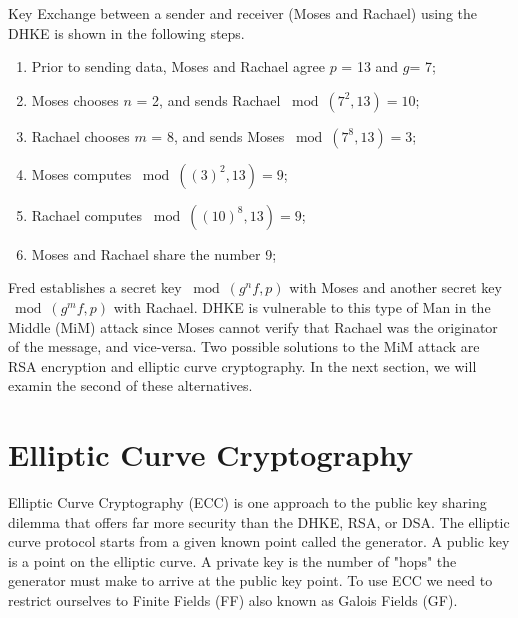  \begin{eg} Key Exchange between a sender and receiver (Moses and Rachael) using the DHKE is shown in the following steps.
\begin{enumerate}[Step 1.]
\item Prior to sending data, Moses and Rachael agree $p$ = 13 and $g$= 7; 
\item Moses chooses $n$ = 2, and sends Rachael $\bmod (7^2 , 13) = 10$;
\item Rachael chooses $m$ = 8, and sends Moses $\bmod (7^8  , 13) = 3 $;
\item Moses computes $\bmod ((3)^2 , 13 ) = 9$;
\item Rachael computes $\bmod ((10)^8 , 13 ) = 9$;
\item Moses and Rachael share the number 9;
\end{enumerate}
\end{eg}

 Fred establishes a secret key $\bmod ( g^nf, p)$ with Moses and another secret key $\bmod ( g^mf, p)$ with Rachael.  DHKE is vulnerable to this type of Man in the Middle (MiM) attack since Moses cannot verify that Rachael was the originator of the message, and vice-versa.  Two possible solutions to the MiM attack are RSA encryption and elliptic curve cryptography. In the next section, we will examin the second of these alternatives. 

\section{Elliptic Curve Cryptography}\label{sec:ECC:2}


Elliptic Curve Cryptography (ECC) is one approach to the public key sharing dilemma that offers far more security than the DHKE, RSA, or DSA.  The elliptic curve protocol starts from a given known point called the generator.  A public key is a point on the elliptic curve.  A private key is the number of "hops" the generator must make to arrive at the public key point.  To use ECC we need to restrict ourselves to Finite Fields (FF) also known as Galois Fields (GF).


